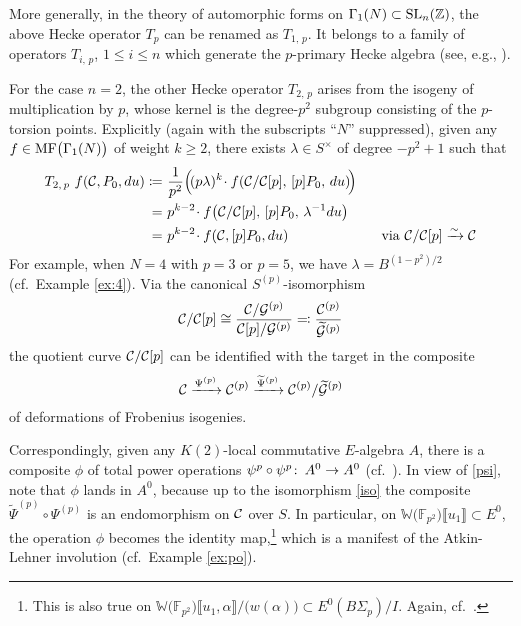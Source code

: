 \documentclass{gtpart}
\theoremstyle{definition}
\theoremstyle{remark}
\def\co{\colon\thinspace}
\newcommand{\mb}[1]{\mathbb{#1}}
\newcommand{\CC}{{\cal C}}
\newcommand{\CG}{{\cal G}}
\newcommand{\BF}{{\mb F}}
\newcommand{\BW}{{\mb W}}
\newcommand{\BZ}{{\mb Z}}
\newcommand{\MF}{{\rm MF}}
\newcommand{\A}{\alpha}
\newcommand{\f}{\phi}
\newcommand{\G}{\Gamma}
\renewcommand{\l}{\lambda}
\newcommand{\ce}{\coloneqq}
\newcommand{\lb}{\llbracket}
\newcommand{\rb}{\rrbracket}
\renewcommand{\=}{\approx}
\renewcommand{\-}{\sim}
\newcommand{\SL}{{\rm SL}}
\numberwithin{equation}{section}
\begin{document}
More generally, in the theory of automorphic forms on 
$\G_1(N) \subset \SL_n(\BZ)$, the above Hecke operator $T_p$ can be renamed as 
$T_{1,\,p}$.  It belongs to a family of operators $T_{i,\,p}$, $1 \leq i \leq n$ 
which generate the $p$-primary Hecke algebra (see, e.g., 
\cite[Theorems 3.20 and 3.35]{AF}).  

For the case $n = 2$, the other Hecke operator $T_{2,\,p}$ arises from the 
isogeny of multiplication by $p$, whose kernel is the degree-$p^2$ subgroup 
consisting of the $p$-torsion points.  Explicitly (again with the subscripts 
``$N$'' suppressed), given any $f \in \MF\big(\G_1(N)\big)$ of weight 
$k \geq 2$, there exists $\l \in S^\times$ of degree $-p^2 + 1$ such that 
\begin{equation}
 \label{T2p}
 \begin{split}
  T_{2,\,p}~f(\CC, P_0, du) \ce & ~ \frac{1}{p^2} \Big(\! (p \l)^k \!\cdot 
                                  f\!\left(\CC/\CC[p], \, [p] P_0, \, 
                                  du\right) \!\!\Big) \\
                              = & ~ p^{k - 2} \!\cdot f\!\left(\CC/\CC[p], \, 
                                  [p] P_0, \, \l^{-1} du\right) \\
                              = & ~ p^{k - 2} \!\cdot f(\CC, [p] P_0, du) 
                                  \qquad\qquad\qquad~~ \text{via 
                                  $\CC/\CC[p] \xrightarrow{\sim} \CC$} 
 \end{split}
\end{equation}
For example, when $N = 4$ with $p = 3$ or $p = 5$, we have 
$\lambda = B^{(1 - p^2)/2}$ (cf.~Example \ref{ex:4}).  Via the canonical 
$S^{(p)}$-isomorphism 
\begin{equation}
 \label{iso}
 \CC/\CC[p] \cong \frac{\CC/\CG^{(p)}}{\CC[p]/\CG^{(p)}} \eqqcolon 
 \frac{\CC^{(p)}}{\widetilde{\CG}^{(p)}} 
\end{equation}
the quotient curve $\CC/\CC[p]$ can be identified with the target in the 
composite 
\[
 \CC \xrightarrow{\Psi^{(p)}} \CC^{(p)} \xrightarrow{\widetilde{\Psi}^{(p)}} 
 \CC^{(p)}/\widetilde{\CG}^{(p)} 
\]
of deformations of Frobenius isogenies.  

Correspondingly, given any $K(2)$-local commutative $E$-algebra $A$, there is a 
composite $\f$ of total power operations $\psi^p \circ \psi^p \co A^0 \to A^0$ 
(cf.~\cite[(26)]{p3}).  In view of \eqref{psi}, note that $\phi$ lands in $A^0$, 
because up to the isomorphism \eqref{iso} the composite 
$\widetilde{\Psi}^{(p)} \circ \Psi^{(p)}$ is an endomorphism on $\CC$ over $S$.  
In particular, on $\BW\big(\BF_{p^2}\big) \lb u_1 \rb \subset E^0$, the 
operation $\phi$ becomes the identity map,\footnote{This is also true on 
$\BW\big(\BF_{p^2}\big) \lb u_1, \A \rb / \big(w(\A)\big) \subset 
E^0(B\Sigma_p)/I$.  Again, cf.~\cite[(26)]{p3}.  } which is a manifest of the 
Atkin-Lehner involution (cf.~Example \ref{ex:po}).  
\end{document}
